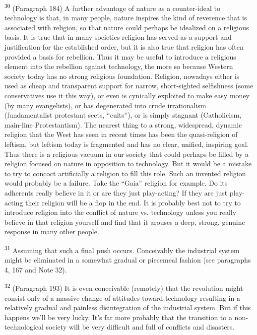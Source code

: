 \documentclass{article}
\begin{document}
\textsuperscript{30} (Paragraph 184) A further advantage of nature as a counter-ideal to technology is that, in many 
people, nature inspires the kind of reverence that is associated with religion, so that nature could 
perhaps be idealized on a religious basis.  It is true that in many societies religion has served as a 
support and justification for the established order, but it is also true that religion has often 
provided a basis for rebellion.  Thus it may be useful to introduce a religious element into the 
rebellion against technology, the more so because Western society today has no strong religious 
foundation.  Religion, nowadays either is used as cheap and transparent support for narrow, 
short-sighted selfishness (some conservatives use it this way), or even is cynically exploited to 
make easy money (by many evangelists), or has degenerated into crude irrationalism 
(fundamentalist protestant sects, “cults”), or is simply stagnant (Catholicism, main-line 
Protestantism).  The nearest thing to a strong, widespread, dynamic religion that the West has 
seen in recent times has been the quasi-religion of leftism, but leftism today is fragmented and 
has no clear, unified, inspiring goal.  Thus there is a religious vacuum in our society that could 
perhaps be filled by a religion focused on nature in opposition to technology.  But it would be a 
mistake to try to concoct artificially a religion to fill this role.  Such an invented religion would 
probably be a failure.  Take the “Gaia” religion for example.  Do its adherents really believe in it 
or are they just play-acting? If they are just play-acting their religion will be a flop in the end.  It 
is probably best not to try to introduce religion into the conflict of nature vs. technology unless 
you really believe in that religion yourself and find that it arouses a deep, strong, genuine 
response in many other people. \vspace{\baselineskip} \newpage

\textsuperscript{31} Assuming that such a final push occurs.  Conceivably the industrial system might be eliminated 
in a somewhat gradual or piecemeal fashion (see paragraphs 4, 167 and Note 32). \vspace{\baselineskip}

\textsuperscript{32} (Paragraph 193) It is even conceivable (remotely) that the revolution might consist only of a 
massive change of attitudes toward technology resulting in a relatively gradual and painless 
disintegration of the industrial system.  But if this happens we’ll be very lucky.  It’s far more 
probably that the transition to a non-technological society will be very difficult and full of 
conflicts and disasters. \vspace{\baselineskip}
\end{document}
